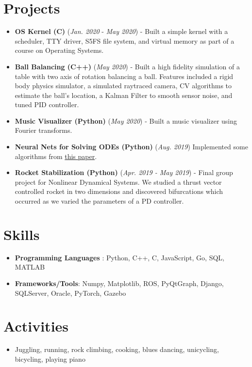 \documentclass[letterpaper,11pt]{article}
\makeatletter
\newcommand{\resumeItem}[2]{
  \item\small{
    \textbf{#1}{#2 \vspace{-2pt}}
  }
}
\newcommand{\resumeSubheadingSimple}[2]{
  \vspace{-1pt}\item
    \begin{tabular*}{0.97\textwidth}{l@{\extracolsep{\fill}}r}
      \textbf{#1} & \textit{\small#2}\\
    \end{tabular*}\vspace{-5pt}
}
\newcommand{\resumeSubHeadingListStart}{\begin{itemize}[leftmargin=*]}
\newcommand{\resumeSubHeadingListEnd}{\end{itemize}}
\newcommand{\resumeItemListStart}{\begin{itemize}}
\newcommand{\resumeItemListEnd}{\end{itemize}\vspace{-5pt}}
\makeatother
\begin{document}
\section{Projects}
  \resumeSubHeadingListStart
\item \textbf{OS Kernel (C)} (\textit{Jan. 2020} - \textit{May 2020}) - Built a simple kernel with a scheduler, TTY driver, S5FS file system, and virtual memory as part of a course on Operating Systems.
\item \textbf{Ball Balancing (C++)} (\textit{May 2020}) - Built a high fidelity simulation of a table with two axis of rotation balancing a ball. Features included a rigid body physics simulator, a simulated raytraced camera, CV algorithms to estimate the ball's location, a Kalman Filter to smooth sensor noise, and tuned PID controller.
\item \textbf{Music Visualizer (Python)} (\textit{May 2020}) - Built a music visualizer using Fourier transforms.
\item \textbf{Neural Nets for Solving ODEs (Python)} (\textit{Aug. 2019}) Implemented some algorithms from \href{https://arxiv.org/abs/physics/9705023}{this paper}.
\item \textbf{Rocket Stabilization (Python)} (\textit{Apr. 2019 - May 2019}) - Final group project for Nonlinear Dynamical Systems. We studied a thrust vector controlled rocket in two dimensions and discovered bifurcations which occurred as we varied the parameters of a PD controller.
    \resumeSubHeadingListEnd
\section{Skills}
  \resumeSubHeadingListStart
    \item \textbf{Programming Languages} : Python, C++, C, JavaScript, Go, SQL, MATLAB
    \item \textbf{Frameworks/Tools}: Numpy, Matplotlib, ROS, PyQtGraph, Django, SQLServer, Oracle, PyTorch, Gazebo
  \resumeSubHeadingListEnd
\section{Activities}
    \resumeSubHeadingListStart
    \item Juggling, running, rock climbing, cooking, blues dancing, unicycling, bicycling, playing piano
  \resumeSubHeadingListEnd
\end{document}
